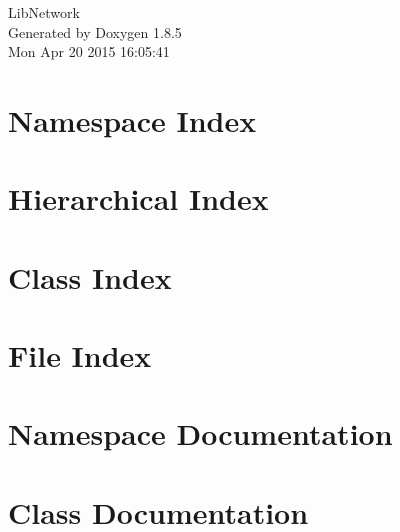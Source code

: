 \documentclass[twoside]{book}
\newcommand{\clearemptydoublepage}{%
  \newpage{\pagestyle{empty}\cleardoublepage}%
}
\begin{document}
\hypersetup{pageanchor=false}
\begin{titlepage}
\vspace*{7cm}
\begin{center}%
{\Large Lib\-Network }\\
\vspace*{1cm}
{\large Generated by Doxygen 1.8.5}\\
\vspace*{0.5cm}
{\small Mon Apr 20 2015 16:05:41}\\
\end{center}
\end{titlepage}
\clearemptydoublepage
\tableofcontents
\clearemptydoublepage
{}
\hypersetup{pageanchor=true}

\chapter{Namespace Index}

\chapter{Hierarchical Index}

\chapter{Class Index}

\chapter{File Index}

\chapter{Namespace Documentation}


\chapter{Class Documentation}


























\end{document}
